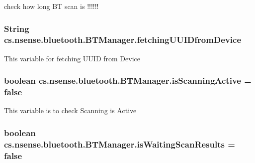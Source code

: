 check how long B\-T scan is !!!!!! \hypertarget{classcs_1_1nsense_1_1bluetooth_1_1_b_t_manager_a2cc473579a3d125f798a8e48b13adbf6}{
\subsubsection[{fetching\-U\-U\-I\-Dfrom\-Device}]{\setlength{\rightskip}{0pt plus 5cm}String cs.\-nsense.\-bluetooth.\-B\-T\-Manager.\-fetching\-U\-U\-I\-Dfrom\-Device\hspace{0.3cm}{\ttfamily [private]}}}\label{classcs_1_1nsense_1_1bluetooth_1_1_b_t_manager_a2cc473579a3d125f798a8e48b13adbf6}
This variable for fetching U\-U\-I\-D from Device \hypertarget{classcs_1_1nsense_1_1bluetooth_1_1_b_t_manager_ad29d05c49cfa52761bcd7efe28239cc7}{
\subsubsection[{is\-Scanning\-Active}]{\setlength{\rightskip}{0pt plus 5cm}boolean cs.\-nsense.\-bluetooth.\-B\-T\-Manager.\-is\-Scanning\-Active = false}}\label{classcs_1_1nsense_1_1bluetooth_1_1_b_t_manager_ad29d05c49cfa52761bcd7efe28239cc7}
This variable is to check Scanning is Active \hypertarget{classcs_1_1nsense_1_1bluetooth_1_1_b_t_manager_ac3b8cb95f53a02bc04f367c1fbcf8a33}{
\subsubsection[{is\-Waiting\-Scan\-Results}]{\setlength{\rightskip}{0pt plus 5cm}boolean cs.\-nsense.\-bluetooth.\-B\-T\-Manager.\-is\-Waiting\-Scan\-Results = false}}\label{classcs_1_1nsense_1_1bluetooth_1_1_b_t_manager_ac3b8cb95f53a02bc04f367c1fbcf8a33}
